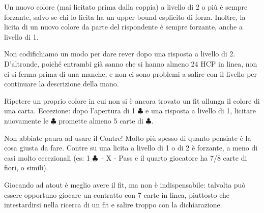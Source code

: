 \documentclass[a4paper,10pt]{article}
\renewcommand{\c}{$\clubsuit$\xspace}
\newcommand{\smallspace}{\vskip0.3cm}
\begin{document}
\smallspace

Un nuovo colore (mai licitato prima dalla coppia) a livello di 2 o più è sempre forzante, salvo se chi lo licita ha un upper-bound esplicito di forza. Inoltre, la licita di un nuovo colore da parte del rispondente è sempre forzante, anche a livello di 1.

\smallspace

Non codifichiamo un modo per dare rever dopo una risposta a livello di 2. D'altronde, poiché entrambi già sanno che si hanno almeno 24 HCP in linea, non ci si ferma prima di una manche, e non ci sono problemi a salire con il livello per continuare la descrizione della mano.

\smallspace


Ripetere un proprio colore in cui non si è ancora trovato un fit allunga il colore di una carta. Eccezione: dopo l'apertura di 1 \c e una risposta a livello di 1, licitare nuovamente le \c promette almeno 5 carte di \c.

\smallspace

Non abbiate paura ad usare il Contre! Molto più spesso di quanto pensiate è la cosa giusta da fare. Contre su una licita a livello di 1 o di 2 è forzante, a meno di casi molto eccezionali (es: 1 \c\ - X - Pass e il quarto giocatore ha 7/8 carte di fiori, o simili).

\smallspace

Giocando ad atout è meglio avere il fit, ma non è indispensabile: talvolta può essere opportuno giocare un contratto con 7 carte in linea, piuttosto che intestardirsi nella ricerca di un fit e salire troppo con la dichiarazione.
\end{document}
